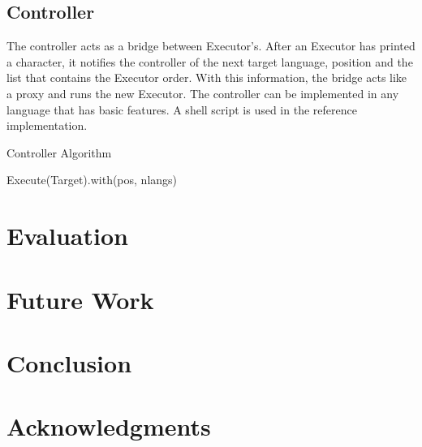 \documentclass[11pt]{article}
\begin{document}
\subsection{Controller}
The controller acts as a bridge between Executor's. After an Executor has printed a character, it notifies the controller of the next target language, position and the list that contains the Executor order. With this information, the bridge acts like a proxy and runs the new Executor. The controller can be implemented in any language that has basic features. A shell script is used in the reference implementation.
\vfill
\raggedbottom

\begin{algorithm}[H]
\caption{Controller Algorithm}
\label{Special Edition}
\begin{algorithmic}[2]
	\State Execute(Target).with(pos, nlangs)
\EndProcedure
\end{algorithmic}
\end{algorithm}


\section{Evaluation}

\section{Future Work}

\section{Conclusion}

\section*{Acknowledgments}




\end{document}
